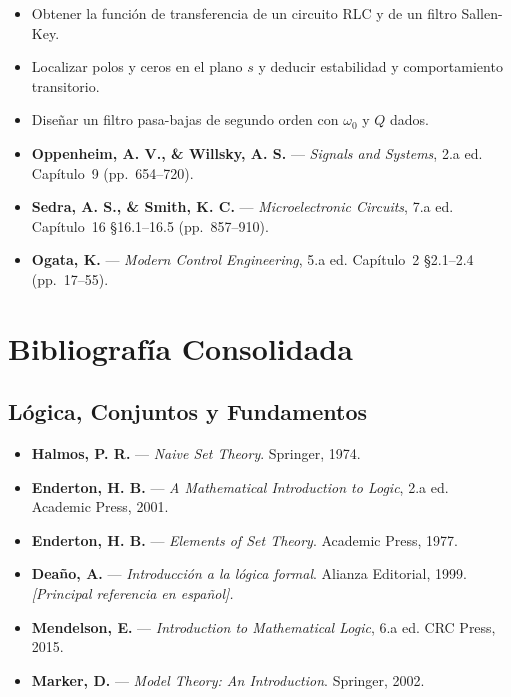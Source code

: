 \documentclass[11pt, letterpaper]{article}
\begin{document}
\begin{objetivos}
\begin{itemize}
  \item Obtener la funci\'on de transferencia de un circuito RLC y de un filtro Sallen-Key.
  \item Localizar polos y ceros en el plano $s$ y deducir estabilidad y comportamiento transitorio.
  \item Dise\~nar un filtro pasa-bajas de segundo orden con $\omega_0$ y $Q$ dados.
\end{itemize}
\end{objetivos}

\begin{lecturas}
\begin{itemize}
  \item[$(\star)$] \textbf{Oppenheim, A. V., \& Willsky, A. S.} --- \emph{Signals and Systems}, 2.a ed. Cap\'itulo~9 (pp.\ 654--720).
  \item[$(\star)$] \textbf{Sedra, A. S., \& Smith, K. C.} --- \emph{Microelectronic Circuits}, 7.a ed. Cap\'itulo~16 \S16.1--16.5 (pp.\ 857--910).
  \item \textbf{Ogata, K.} --- \emph{Modern Control Engineering}, 5.a ed. Cap\'itulo~2 \S2.1--2.4 (pp.\ 17--55).
\end{itemize}
\end{lecturas}

\newpage

\section{Bibliograf\'ia Consolidada}

\subsection*{L\'ogica, Conjuntos y Fundamentos}
\begin{itemize}
  \item \textbf{Halmos, P. R.} --- \emph{Naive Set Theory}. Springer, 1974.
  \item \textbf{Enderton, H. B.} --- \emph{A Mathematical Introduction to Logic}, 2.a ed. Academic Press, 2001.
  \item \textbf{Enderton, H. B.} --- \emph{Elements of Set Theory}. Academic Press, 1977.
  \item \textbf{Deaño, A.} --- \emph{Introducci\'on a la l\'ogica formal}. Alianza Editorial, 1999. \textit{[Principal referencia en espa\~nol].}
  \item \textbf{Mendelson, E.} --- \emph{Introduction to Mathematical Logic}, 6.a ed. CRC Press, 2015.
  \item \textbf{Marker, D.} --- \emph{Model Theory: An Introduction}. Springer, 2002.
\end{itemize}
\end{document}
